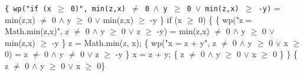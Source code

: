 \documentclass[11pt]{article}
\begin{document}
\begin{enumerate}
{\newpage
\item \texttt{\{ wp("if (x $\geq$ 0)", min(z,x) $\neq$ 0 $\land$ y $\geq$ 0 $\lor$ min(z,x) $\geq$ -y)} = { min(z,x) $\neq$ 0 $\land$ y $\geq$ 0 $\lor$ min(z,x) $\geq$ -y \}
\newline
if (x $\geq$ 0) \{
\newline
\hspace*{1cm}\{ wp("z = Math.min(z,x)", z $\neq$ 0 $\wedge$ y $\geq$ 0 $\vee$ z $\geq$ -y) } = { min(z,x) $\neq$ 0 $\wedge$ y $\geq$ 0 $\vee$ min(z,x) $\geq$ -y \}
\newline
\hspace*{0.5cm} z = Math.min(z, x);
\newline
\hspace*{1cm}\{ wp("x = z + y", z $\neq$ 0 $\wedge$ y $\geq$ 0 $\vee$ x $\geq$ 0) } = { z $\neq$ 0 $\wedge$ y $\neq$ 0 $\vee$ z $\geq$ -y \}
\newline
\hspace*{0.5cm} x = z + y;
\newline
\hspace*{1cm}\{ z $\neq$ 0 $\wedge$ y $\geq$ 0 $\vee$ x $\geq$ 0 \}
\newline
\}
\newline
\{ z $\neq$ 0 $\land$ y $\geq$ 0 $\lor$ x $\geq$ 0\}}


}
\end{enumerate}
\end{document}
